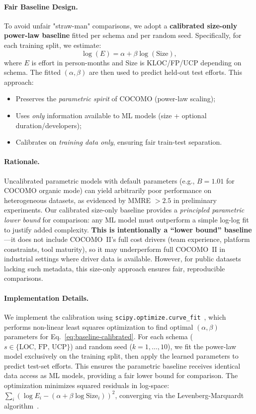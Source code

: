\documentclass{ieeeaccess}
\begin{document}
\paragraph{Fair Baseline Design.}
To avoid unfair "straw-man" comparisons, we adopt a \textbf{calibrated size-only power-law baseline} fitted per schema and per random seed. Specifically, for each training split, we estimate:
\begin{equation}
\log(E) = \alpha + \beta \log(\text{Size}),
\label{eq:baseline-calibrated}
\end{equation}
where $E$ is effort in person-months and Size is KLOC/FP/UCP depending on schema. The fitted $(\alpha, \beta)$ are then used to predict held-out test efforts. This approach:
\begin{itemize}[leftmargin=1.5em]
    \item Preserves the \textit{parametric spirit} of COCOMO (power-law scaling);
    \item Uses \textit{only} information available to ML models (size + optional duration/developers);
    \item Calibrates on \textit{training data only}, ensuring fair train-test separation.
\end{itemize}

\paragraph{Rationale.}
Uncalibrated parametric models with default parameters (e.g., $B=1.01$ for COCOMO organic mode) can yield arbitrarily poor performance on heterogeneous datasets, as evidenced by MMRE $>2.5$ in preliminary experiments. Our calibrated size-only baseline provides a \textit{principled parametric lower bound} for comparison: any ML model must outperform a simple log-log fit to justify added complexity. \textbf{This is intentionally a ``lower bound'' baseline}---it does not include COCOMO~II's full cost drivers (team experience, platform constraints, tool maturity), so it may underperform full COCOMO~II in industrial settings where driver data is available. However, for public datasets lacking such metadata, this size-only approach ensures fair, reproducible comparisons.

\paragraph{Implementation Details.}
We implement the calibration using \texttt{scipy.optimize.curve\_fit}~\cite{virtanen2020scipy}, which performs non-linear least squares optimization to find optimal $(\alpha, \beta)$ parameters for Eq.~\ref{eq:baseline-calibrated}. For each schema ($s \in \{\text{LOC, FP, UCP}\}$) and random seed ($k=1,\ldots,10$), we fit the power-law model exclusively on the training split, then apply the learned parameters to predict test-set efforts. This ensures the parametric baseline receives identical data access as ML models, providing a fair lower bound for comparison. The optimization minimizes squared residuals in log-space: $\sum_i (\log E_i - (\alpha + \beta \log \text{Size}_i))^2$, converging via the Levenberg-Marquardt algorithm~\cite{more1978levenberg}.
\end{document}
